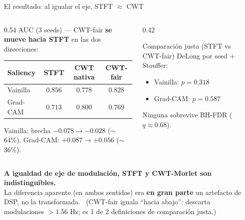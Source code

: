 \documentclass[aspectratio=169, 11pt]{beamer}
\begin{document}
\begin{frame}{El resultado: al igualar el eje, STFT $\approx$ CWT}

\begin{columns}[T]
\begin{column}{0.54\textwidth}
\centering
\small AUC (3 seeds) --- CWT-fair \textbf{se mueve hacia STFT} en las dos direcciones:
\begin{table}
\centering
\small
\begin{tabular}{l c c c}
\toprule
Saliency & STFT & CWT nativa & \textbf{CWT-fair} \\
\midrule
Vainilla & $0.856$ & $0.778$ & $\mathbf{0.828}$ \\
Grad-CAM & $0.713$ & $0.800$ & $\mathbf{0.769}$ \\
\bottomrule
\end{tabular}
\end{table}
\vspace{2pt}
{\scriptsize Vainilla: brecha $-0.078 \to -0.028$ ($\sim$64\%). \quad
Grad-CAM: $+0.087 \to +0.056$ ($\sim$36\%).}
\end{column}
\begin{column}{0.42\textwidth}
\begin{block}{Comparación justa (STFT vs CWT-fair)}
\small DeLong por seed + Stouffer:
\begin{itemize}
    \item Vainilla: $p = 0.318$
    \item Grad-CAM: $p = 0.587$
\end{itemize}
\centering\footnotesize Ninguna sobrevive BH-FDR ($q \approx 0.68$).
\end{block}
\end{column}
\end{columns}

\vfill
\centering
\textbf{A igualdad de eje de modulación, STFT y CWT-Morlet son
indistinguibles.} \\
\small La diferencia aparente (en ambos sentidos) era \textbf{en gran
parte} un artefacto de DSP, no la transformada.
{\scriptsize\ (CWT-fair iguala ``hacia abajo'': descarta modulaciones
$>1.56$ Hz; es 1 de 2 definiciones de comparación justa.)}

\end{frame}
\end{document}

